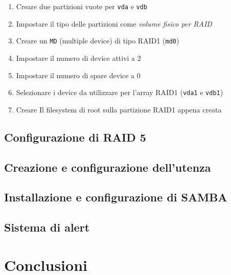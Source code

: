\documentclass[11pt]{article}
\begin{document}
\begin{enumerate}
    \item Creare due partizioni vuote per \texttt{vda} e \texttt{vdb}
    \item Impostare il tipo delle partizioni come \textit{volume fisico per RAID}
    \item Creare un \texttt{MD} (multiple device) di tipo RAID1 (\texttt{md0})
    \item Impostare il numero di device attivi a 2
    \item Impostare il numero di spare device a 0
    \item Selezionare i device da utilizzare per l'array RAID1 (\texttt{vda1} e \texttt{vdb1})
    \item Creare Il filesystem di root sulla partizione RAID1 appena creata
\end{enumerate}


\subsection{Configurazione di RAID 5}


\subsection{Creazione e configurazione dell'utenza}
\subsection{Installazione e configurazione di SAMBA}
\subsection{Sistema di alert}



\section{Conclusioni}
\end{document}
